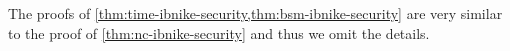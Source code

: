 The proofs of \cref{thm:time-ibnike-security,thm:bsm-ibnike-security} are very similar to the proof of \cref{thm:nc-ibnike-security} and thus we omit the details.
%	

